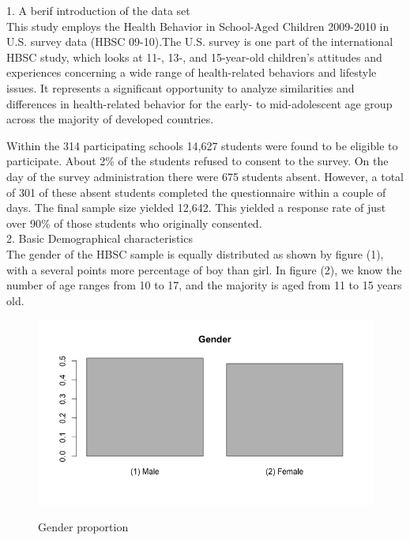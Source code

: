 \documentclass[12pt]{article}
\begin{document}
1. A berif introduction of the data set\\

This study employs the Health Behavior in School-Aged Children 2009-2010 in U.S. survey data (HBSC 09-10).The U.S. survey is one part of the international HBSC study, which looks at 11-, 13-, and 15-year-old children’s attitudes and experiences concerning a wide range of health-related behaviors and lifestyle issues. It represents a significant opportunity to analyze similarities and differences in health-related behavior for the early- to mid-adolescent age group across the majority of developed countries.

Within the 314 participating schools 14,627 students were found to be eligible to participate. About 2\% of the students refused to consent to the survey. On the day of the survey administration there were 675 students absent. However, a total of 301 of these absent students completed the questionnaire within a couple of days. The final sample size yielded 12,642. This yielded a response rate of just over 90\% of those students who originally consented. \\


2. Basic Demographical characteristics\\

The gender of the HBSC sample is equally distributed as shown by figure (1), with a several points more percentage of boy than girl. In figure (2), we know the number of age ranges from 10 to 17, and the majority is aged from 11 to 15 years old. 

\begin{figure}[hptb]
	\centering
{\includegraphics[scale=0.45]{genderpic.png}} \;
\caption{Gender proportion}
	\label{fig:img}
\end{figure}
\end{document}
